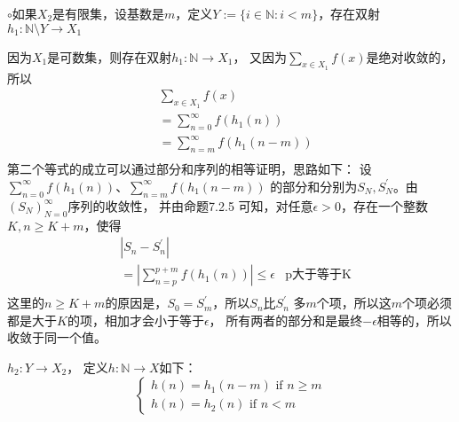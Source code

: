\documentclass{article}
\begin{document}
\begin{itemize}
        $\circ$如果$X_2$是有限集，设基数是$m$，定义$Y := \{i \in \mathbb{N} : i < m\}$，存在双射
        $h_1: \mathbb{N} \setminus Y \rightarrow X_1$
        \begin{zremark}
          因为$X_1$是可数集，则存在双射$h_1: \mathbb{N} \rightarrow X_1$，
          又因为$\sum \limits_{x \in X_1} f(x) $是绝对收敛的，所以
          \begin{align*}
             & \sum \limits_{x \in X_1} f(x)           \\
             & = \sum \limits_{n=0}^\infty f(h_1(n))   \\
             & = \sum \limits_{n=m}^\infty f(h_1(n-m)) \\
          \end{align*}
          第二个等式的成立可以通过部分和序列的相等证明，思路如下：
          设$\sum \limits_{n=0}^\infty f(h_1(n))$、$\sum \limits_{n=m}^\infty f(h_1(n-m))$
          的部分和分别为$S_N, S_{N}^\prime$。由$(S_N)_{N=0}^\infty$序列的收敛性，
          并由命题7.2.5 可知，对任意$\epsilon > 0$，存在一个整数$K, n \geq K+m$，使得
          \begin{align*}
             & |S_n - S_{n}^\prime|                                                 \\
             & = |\sum \limits_{n=p}^{p+m} f(h_1(n))| \leq \epsilon & \text{p大于等于K} \\
          \end{align*}
          这里的$n \geq K + m$的原因是，$S_0 = S_m^\prime$，所以$S_n$比$S_n^\prime$
          多$m$个项，所以这$m$个项必须都是大于$K$的项，相加才会小于等于$\epsilon$，
          所有两者的部分和是最终$-\epsilon$相等的，所以收敛于同一个值。
        \end{zremark}

        $h_2: Y \rightarrow X_2$，
        定义$h: \mathbb{N} \rightarrow X$如下：
        \begin{equation}
          \begin{cases*}
            h(n) = h_1(n-m) \text{  if  } n \geq m \\
            h(n) = h_2(n) \text{  if  } n < m
          \end{cases*}
        \end{equation}


\end{itemize}
\end{document}
